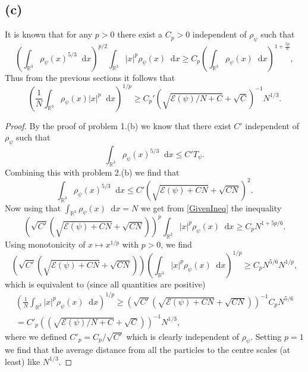 \documentclass[a4paper,11pt]{article}
\newcommand{\abs}[1]{\left\lvert #1 \right\rvert}
\newcommand*\diff{\mathop{}\!\mathrm{d}}
\newcommand{\R}{\mathbb{R}}
\numberwithin{equation}{section}
\begin{document}
 	\subsection*{(c)}
 	It is known that for any $ p>0 $ there exist a $ C_p>0 $ independent of $ \rho_\psi $ such that \begin{equation}\label{GivenIneq}
 	\left(\int_{\R^3}\rho_\psi(x)^{5/3} \diff x\right)^{p/2}\int_{\R^3}\abs{x}^p\rho_\psi(x) \diff x\geq C_p\left(\int_{\R^3}\rho_\psi(x) \diff x\right)^{1+\frac{5p}{6}},
 	\end{equation}
 	Thus from the previous sections it follows that\begin{equation}
 	\left(\frac{1}{N}\int_{\R^3}\rho_\psi(x)\abs{x}^p\diff x\right)^{1/p}\geq C_p'\left(\sqrt{\mathcal{E}(\psi)/N+C}+\sqrt{C}\right)^{-1}N^{1/3}.
 	\end{equation}
 	\begin{proof}
 		By the proof of problem 1.(b) we know that there exist $ C' $ independent of $ \rho_\psi $ such that \begin{equation}
 		\int_{\R^3}\rho_\psi(x)^{5/3} \diff x\leq C'T_\psi.
 		\end{equation}
 		Combining this with problem 2.(b) we find that \begin{equation}
 		\int_{\R^3}\rho_\psi(x)^{5/3} \diff x\leq C'(\sqrt{\mathcal{E}(\psi)+CN}+\sqrt{CN})^2.
 		\end{equation}
 		Now using that $ \int_{\R^3}\rho_\psi(x)\diff x=N $ we get from \eqref{GivenIneq} the inequality\begin{equation}
 		\left(\sqrt{C'}(\sqrt{\mathcal{E}(\psi)+CN}+\sqrt{CN})\right)^{p}\int_{\R^3}\abs{x}^p\rho_\psi(x) \diff x\geq C_pN^{1+5p/6}.
 		\end{equation}
 		Using monotonicity of $ x\mapsto x^{1/p} $ with $ p>0 $, we find \begin{equation}
 		\left(\sqrt{C'}(\sqrt{\mathcal{E}(\psi)+CN}+\sqrt{CN})\right)\left(\int_{\R^3}\abs{x}^p\rho_\psi(x) \diff x\right)^{1/p}\geq C_pN^{5/6}N^{1/p},
 		\end{equation}
 		which is equivalent to (since all quantities are positive) \begin{equation}
 		\begin{aligned}
 		\left(\frac{1}{N}\int_{\R^3}\abs{x}^p\rho_\psi(x) \diff x\right)^{1/p}\geq \left(\sqrt{C'}(\sqrt{\mathcal{E}(\psi)+CN}+\sqrt{CN})\right)^{-1} C_pN^{5/6}\\=C'_p\left((\sqrt{\mathcal{E}(\psi)/N+C}+\sqrt{C})\right)^{-1}N^{1/3},
 		\end{aligned}
 		\end{equation}
 		where we defined $ C'_p=C_p/\sqrt{C'} $ which is clearly independent of $ \rho_\psi $. Setting $ p=1 $ we find that the average distance from all the particles to the centre scales (at least) like $ N^{1/3} $.
 	\end{proof}
 	\pagebreak
\end{document}
